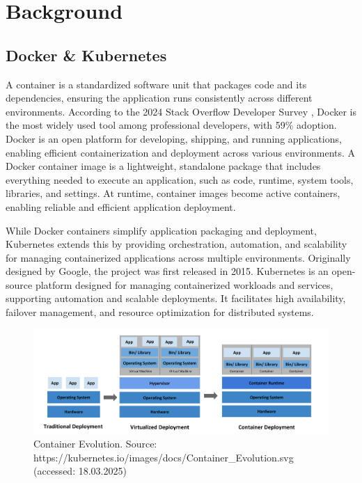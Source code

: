 \documentclass[../main.tex]{subfiles}
\begin{document}
\chapter{Background}

\section{Docker \& Kubernetes} 

A container is a standardized software unit that packages code and its dependencies, ensuring the application runs consistently across different environments. According to the 2024 Stack Overflow Developer Survey \cite{surveystackoverflow}, Docker is the most widely used tool among professional developers, with 59\% adoption. Docker is an open platform for developing, shipping, and running applications, enabling efficient containerization and deployment across various environments. A Docker container image is a lightweight, standalone package that includes everything needed to execute an application, such as code, runtime, system tools, libraries, and settings. At runtime, container images become active containers, enabling reliable and efficient application deployment. \cite{container}

While Docker containers simplify application packaging and deployment, Kubernetes extends this by providing orchestration, automation, and scalability for managing containerized applications across multiple environments. Originally designed by Google, the project was first released in 2015. Kubernetes is an open-source platform designed for managing containerized workloads and services, supporting automation and scalable deployments. It facilitates high availability, failover management, and resource optimization for distributed systems. 

\begin{figure}[H]
    \centering
    \includegraphics[scale=0.5]{img/3-background/kubernetes/container_evolution.png}
    \caption{Container Evolution. Source: https://kubernetes.io/images/docs/Container\_Evolution.svg (accessed: 18.03.2025)}
    \label{fig:container_evolution}
\end{figure}
\end{document}

